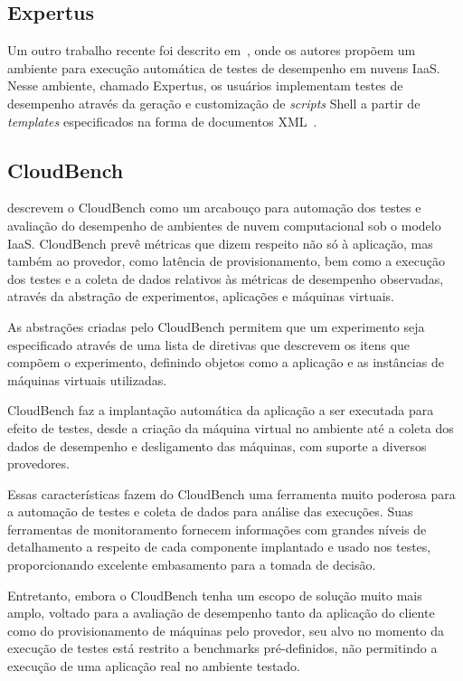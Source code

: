 \subsection{Expertus}
Um outro trabalho recente foi descrito em~\cite{jayasinghe2012}, onde os autores propõem um ambiente para execução automática de testes de desempenho em nuvens IaaS.  Nesse ambiente, chamado Expertus, os usuários implementam testes de desempenho através da geração e customização de \textit{scripts} Shell a partir de {\em templates} especificados na forma de documentos XML~\cite{jayasinghe2012}. 

\subsection{CloudBench}
\cite{silva2013cloudbench} descrevem o CloudBench como um arcabouço para 
automação dos testes e avaliação do desempenho de ambientes de nuvem computacional 
sob o modelo IaaS. CloudBench prevê métricas que dizem respeito não só à aplicação,
mas também ao provedor, como latência de provisionamento, bem como a execução dos 
testes e a coleta de dados relativos às métricas de desempenho observadas, através 
da abstração de experimentos, aplicações e máquinas virtuais.   

As abstrações criadas pelo CloudBench permitem que um experimento seja 
especificado através de uma lista de diretivas que descrevem os itens
que compõem o experimento, definindo objetos como a aplicação e as instâncias de 
máquinas virtuais utilizadas.

CloudBench faz a implantação automática da aplicação a ser executada para
efeito de testes, desde a criação da máquina virtual no ambiente até a coleta dos
dados de desempenho e desligamento das máquinas, com suporte a diversos provedores.

Essas características fazem do CloudBench uma ferramenta muito poderosa para a
automação de testes e coleta de dados para análise das execuções. Suas ferramentas
de monitoramento fornecem informações com grandes níveis de detalhamento a respeito
de cada componente implantado e usado nos testes, proporcionando excelente embasamento
para a tomada de decisão.

Entretanto, embora o CloudBench tenha um escopo de solução muito mais amplo, 
voltado para a avaliação de desempenho tanto da aplicação do cliente como do 
provisionamento de máquinas pelo provedor, seu alvo no momento da execução de 
testes está restrito a benchmarks pré-definidos, não permitindo a execução de 
uma aplicação real no ambiente testado.

